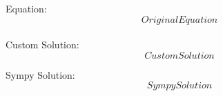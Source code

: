 \documentclass[12pt,fleqn]{article}
\begin{document}
Equation:\\
$$OriginalEquation$$
\\

Custom Solution:\\
$$CustomSolution$$

Sympy Solution:\\
$$SympySolution$$
\\
\end{document}
